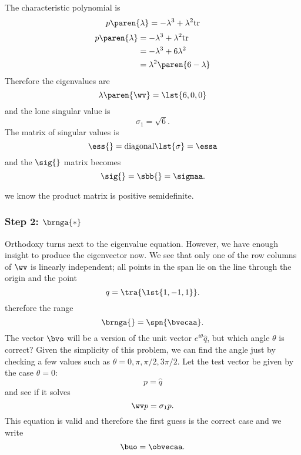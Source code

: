 The characteristic polynomial is
\begin{equation}
  p\paren{\lambda} = -\lambda^{3} + \lambda^{2} \text{tr}
\end{equation}
\begin{equation}
  \begin{split}
    p\paren{\lambda} 
     &= -\lambda^{3} + \lambda^{2} \text{tr} \\
     &= -\lambda^{3} + 6\lambda^{2} \\
     &=  \lambda^{2}\paren{6-\lambda}
  \end{split}
\end{equation}
Therefore the eigenvalues are
\begin{equation}
  \lambda \paren{\wv} = \lst{ 6, 0, 0 } 
\end{equation}
and the lone singular value is
\begin{equation}
  \sigma_{1} = \sqrt{ 6 }.
\end{equation}
The matrix of singular values is
\begin{equation}
  \ess{} = \text{diagonal} \lst{\sigma} = \essa
\end{equation}
and the $\sig{}$ matrix becomes
\begin{equation}
  \sig{} = \sbb{} = \sigmaa.
\end{equation}

we know the product matrix is positive semidefinite.


\subsubsection{Step 2: $\brnga{*}$}
Orthodoxy turns next to the eigenvalue equation. However, we have enough insight to produce the eigenvector now. We see that only one of the row columns of $\wv$ is linearly independent; all points in the span lie on the line through the origin and the point
\begin{equation}
  q = \tra{\lst{ 1, -1, 1 }}.
\end{equation}
therefore the range
\begin{equation}
  \brnga{} = \spn{ \bvecaa }.
\end{equation}
The vector $\bvo$ will be a version of the unit vector $e^{i\theta} \hat{q}$, but which angle $\theta$ is correct? Given the simplicity of this problem, we can find the angle just by checking a few values such as $\theta = 0, \pi, \pi/2, 3\pi/2$. Let the test vector be given by the case $\theta = 0$:
\begin{equation}
  p = \hat{q}
\end{equation}
and see if it solves
\begin{equation}
  \wv p = \sigma_{1} p.
\end{equation}
This equation is valid and therefore the first guess is the correct case and we write
\begin{equation}
  \buo = \obvecaa .
\end{equation}


